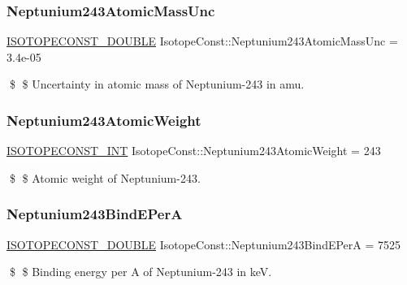 \subsubsection{\texorpdfstring{Neptunium243\+Atomic\+Mass\+Unc}{Neptunium243AtomicMassUnc}}
{\footnotesize\ttfamily \mbox{\hyperlink{group___isotope_const-_macros_ga8f45a7272ce02c0b4c65c44636ed719a}{I\+S\+O\+T\+O\+P\+E\+C\+O\+N\+S\+T\+\_\+\+D\+O\+U\+B\+LE}} Isotope\+Const\+::\+Neptunium243\+Atomic\+Mass\+Unc = 3.\+4e-\/05}

\$ \$ Uncertainty in atomic mass of Neptunium-\/243 in amu. \mbox{\label{group___isotope_const-_neptunium-_np243_ga52a01ea4b744ec2cc512d9db28e7d331}} 
\subsubsection{\texorpdfstring{Neptunium243\+Atomic\+Weight}{Neptunium243AtomicWeight}}
{\footnotesize\ttfamily \mbox{\hyperlink{group___isotope_const-_macros_ga5f18360b3e99483a35c32d789e62621c}{I\+S\+O\+T\+O\+P\+E\+C\+O\+N\+S\+T\+\_\+\+I\+NT}} Isotope\+Const\+::\+Neptunium243\+Atomic\+Weight = 243}

\$ \$ Atomic weight of Neptunium-\/243. \mbox{\label{group___isotope_const-_neptunium-_np243_ga63dcfcd671aa67ab3b5327bc0c1b11e8}} 
\subsubsection{\texorpdfstring{Neptunium243\+Bind\+E\+PerA}{Neptunium243BindEPerA}}
{\footnotesize\ttfamily \mbox{\hyperlink{group___isotope_const-_macros_ga8f45a7272ce02c0b4c65c44636ed719a}{I\+S\+O\+T\+O\+P\+E\+C\+O\+N\+S\+T\+\_\+\+D\+O\+U\+B\+LE}} Isotope\+Const\+::\+Neptunium243\+Bind\+E\+PerA = 7525}

\$ \$ Binding energy per A of Neptunium-\/243 in keV. \mbox{\label{group___isotope_const-_neptunium-_np243_ga437f314577a5cec5a334f549268600c4}} 
